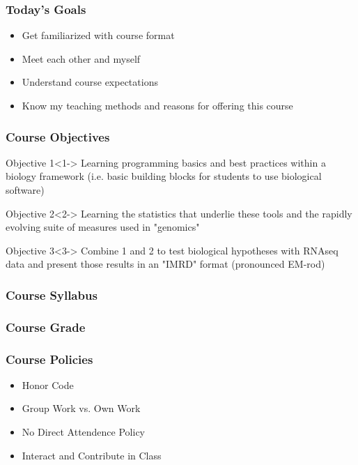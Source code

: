 \documentclass[14pt]{beamer}
\begin{document}
\begin{frame}
\frametitle{Today's Goals}
\begin{itemize}
\item Get familiarized with course format
\item Meet each other and myself
\item Understand course expectations
\item Know my teaching methods and reasons for offering this course
\end{itemize}


\end{frame}
\begin{frame}
\frametitle{Course Objectives}
\small
\begin{block}{Objective 1}<1->
Learning programming basics and best practices within a biology framework (i.e. basic building blocks for students to use biological software)
\end{block}

\begin{block}{Objective 2}<2->
Learning the statistics that underlie these tools and the rapidly evolving suite of measures used in "genomics"
\end{block}

\begin{block}{Objective 3}<3->
Combine 1 and 2 to test biological hypotheses with RNAseq data and present those results in an "IMRD" format (pronounced EM-rod)
\end{block}
\normalsize

\end{frame}
\begin{frame}
\frametitle{Course Syllabus}
\end{frame}
\begin{frame}
\frametitle{Course Grade}
\end{frame}
\begin{frame}
\frametitle{Course Policies}
\begin{itemize}
	\item<1-> Honor Code
	\item<2-> Group Work vs. Own Work
	\item<3-> No Direct Attendence Policy
	\item<4-> Interact and Contribute in Class
\end{itemize}


\end{frame}
\end{document}
